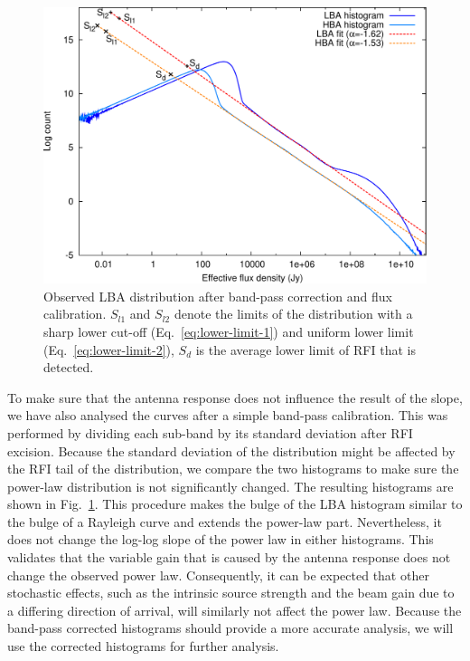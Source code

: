 \documentclass[useAMS,usenatbib]{mn2e}
\begin{document}
\begin{figure}
\begin{center}
\includegraphics[width=13cm]{img/histograms-corrected-trimmed}
\caption{Observed LBA distribution after band-pass correction and flux calibration. $S_{l1}$ and $S_{l2}$ denote the limits of the distribution with a sharp lower cut-off (Eq.~\eqref{eq:lower-limit-1}) and uniform lower limit (Eq.~\eqref{eq:lower-limit-2}), $S_d$ is the average lower limit of RFI that is detected.}
\label{fig:histogram-passband-corrected}
\end{center}
\end{figure}

To make sure that the antenna response does not influence the result of the slope, we have also analysed the curves after a simple band-pass calibration. This was performed by dividing each sub-band by its standard deviation after RFI excision. Because the standard deviation of the distribution might be affected by the RFI tail of the distribution, we compare the two histograms to make sure the power-law distribution is not significantly changed. The resulting histograms are shown in Fig.~\ref{fig:histogram-passband-corrected}. This procedure makes the bulge of the LBA histogram similar to the bulge of a Rayleigh curve and extends the power-law part. Nevertheless, it does not change the log-log slope of the power law in either histograms. This validates that the variable gain that is caused by the antenna response does not change the observed power law. Consequently, it can be expected that other stochastic effects, such as the intrinsic source strength and the beam gain due to a differing direction of arrival, will similarly not affect the power law. Because the band-pass corrected histograms should provide a more accurate analysis, we will use the corrected histograms for further analysis.
\end{document}
